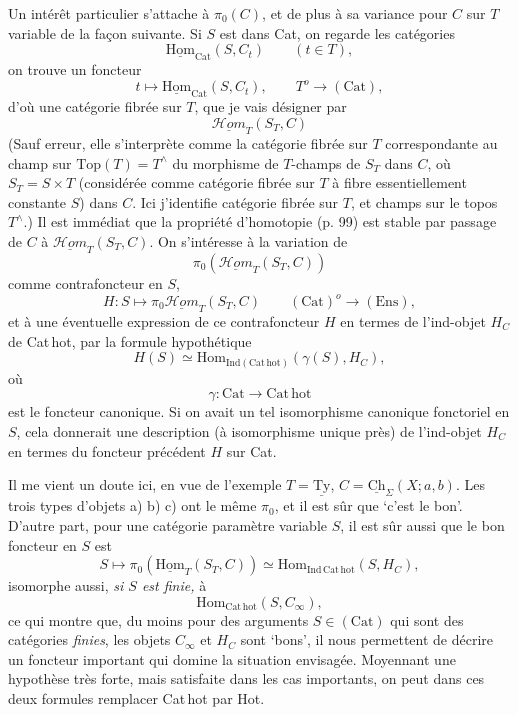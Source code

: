 \documentclass[11pt]{article}
\newcommand{\printedpage}[1]{\marginpar{\footnotesize p.~#1}}
\newcommand{\msp}[1]{\marginpar{\footnotesize [#1]}}
\newcommand{\uTy}{\underline{\mathrm{Ty}}}
\newcommand{\Hom}{\mathrm{Hom}}
\newcommand{\uHom}{\underline{\mathrm{Hom}}}
\newcommand{\uCh}{\underline{\mathrm{Ch}}}
\newcommand{\Cat}{\mathrm{Cat}}
\newcommand{\Cathot}{\mathrm{Cat\,hot}}
\newcommand{\sHom}{\underline{\mathcal{H}\mathit{om}}}
\begin{document}
Un intérêt particulier s'attache à $\pi_{0}(C)$, et de plus à sa variance pour $C$ sur $T$ variable de la façon suivante. Si $S$ est dans Cat, on regarde les catégories
\[
\uHom_{\Cat}(S,C_{t}) \qquad (t \in T),
\]
on trouve un foncteur
\[
t \longmapsto \uHom_{\Cat}(S,C_{t}), \qquad T^{o} \longrightarrow (\Cat),
\]
d'où une catégorie fibrée sur $T$, que je vais désigner par
\[
\sHom_{T}(S_{T},C)
\]
(Sauf erreur, elle s'interprète comme la catégorie fibrée sur $T$ correspondante au champ sur $\mathrm{Top}(T) = T^{\wedge}$ du morphisme de $T$-champs de $S_{T}$ dans $C$, où $S_{T} = S \times T$ (considérée comme catégorie fibrée sur $T$ à fibre essentiellement constante $S$) dans $C$. Ici j'identifie catégorie fibrée sur $T$, et champs sur le topos $T^{\wedge}$.) Il est immédiat que la propriété d'homotopie (p. 99) est stable par passage de $C$ à $\sHom_{T}(S_{T},C)$. On s'intéresse à la variation de
\[
\pi_{0}(\sHom_{T}(S_{T},C))
\]
\printedpage{68}
\msp{page 106}
comme contrafoncteur en $S$,
\[
H : S \longmapsto \pi_{0}\sHom_{T}(S_{T},C) \qquad (\Cat)^{o} \longrightarrow (\mathrm{Ens}),
\]
et à une éventuelle expression de ce contrafoncteur $H$ en termes de l'ind-objet $H_{C}$ de Cat\,hot, par la formule hypothétique
\[
H(S) \simeq \Hom_{\mathrm{Ind}(\Cathot)}(\gamma(S),H_{C}),
\]
où
\[
\gamma : \Cat \longrightarrow \Cathot
\]
est le foncteur canonique. Si on avait un tel isomorphisme canonique fonctoriel en $S$, cela donnerait une description (à isomorphisme unique près) de l'ind-objet $H_{C}$ en termes du foncteur précédent $H$ sur Cat.

Il me vient un doute ici, en vue de l'exemple $T = \uTy$, $C = \uCh_{\Sigma}(X;a,b)$. Les trois types d'objets a) b) c) ont le même $\pi_{0}$, et il est sûr que ‘c'est le bon'. D'autre part, pour une catégorie paramètre variable $S$, il est sûr aussi que le bon foncteur en $S$ est
\[
S \longmapsto \pi_{0}(\uHom_{T}(S_{T},C)) \simeq \Hom_{\mathrm{Ind}\,\Cathot}(S,H_{C}),
\]
isomorphe aussi, \textit{si $S$ est finie,} à
\[
\Hom_{\Cathot}(S,C_{\infty}),
\]
ce qui montre que, du moins pour des arguments $S \in (\Cat)$ qui sont des catégories \textit{finies}, les objets
\msp{page 107}
$C_{\infty}$ et $H_{C}$ sont ‘bons', il nous permettent %
de décrire un foncteur important qui domine la situation envisagée. Moyennant une hypothèse très forte, mais satisfaite dans les cas importants, on peut dans ces deux formules remplacer Cat\,hot par Hot.
\end{document}
